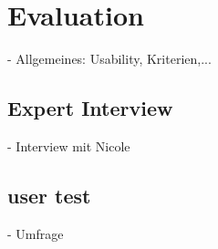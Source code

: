 \chapter{Evaluation}
- Allgemeines: Usability, Kriterien,... 
\section{Expert Interview}
- Interview mit Nicole
\section{user test}
- Umfrage 